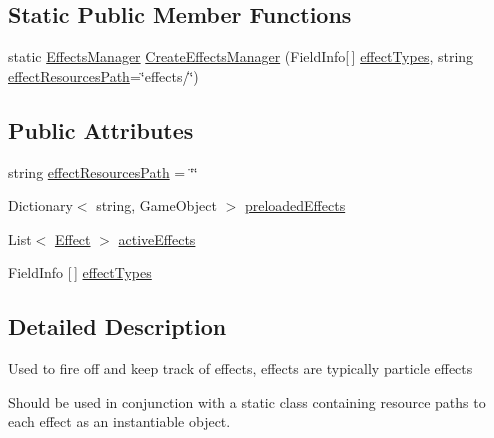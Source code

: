 \subsection*{Static Public Member Functions}
\begin{DoxyCompactItemize}
\item 
static \mbox{\hyperlink{class_stompy_blondie_1_1_systems_1_1_effects_manager}{Effects\+Manager}} \mbox{\hyperlink{class_stompy_blondie_1_1_systems_1_1_effects_manager_a9c38a685a51d9dafe2b0734a457d6801}{Create\+Effects\+Manager}} (Field\+Info\mbox{[}$\,$\mbox{]} \mbox{\hyperlink{class_stompy_blondie_1_1_systems_1_1_effects_manager_a185cf6e4134d962c94b3ea7e39355339}{effect\+Types}}, string \mbox{\hyperlink{class_stompy_blondie_1_1_systems_1_1_effects_manager_a9e917930d6e328a83cb87639ac1b3599}{effect\+Resources\+Path}}=\char`\"{}effects/\char`\"{})
\end{DoxyCompactItemize}
\subsection*{Public Attributes}
\begin{DoxyCompactItemize}
\item 
string \mbox{\hyperlink{class_stompy_blondie_1_1_systems_1_1_effects_manager_a9e917930d6e328a83cb87639ac1b3599}{effect\+Resources\+Path}} = \char`\"{}\char`\"{}
\item 
Dictionary$<$ string, Game\+Object $>$ \mbox{\hyperlink{class_stompy_blondie_1_1_systems_1_1_effects_manager_abde357ddd92a368b4eebc347b5bc3c66}{preloaded\+Effects}}
\item 
List$<$ \mbox{\hyperlink{class_stompy_blondie_1_1_systems_1_1_effect}{Effect}} $>$ \mbox{\hyperlink{class_stompy_blondie_1_1_systems_1_1_effects_manager_ae66380ec6b74d10b8e3cb2ee8e5fca1e}{active\+Effects}}
\item 
Field\+Info \mbox{[}$\,$\mbox{]} \mbox{\hyperlink{class_stompy_blondie_1_1_systems_1_1_effects_manager_a185cf6e4134d962c94b3ea7e39355339}{effect\+Types}}
\end{DoxyCompactItemize}


\subsection{Detailed Description}
Used to fire off and keep track of effects, effects are typically particle effects

Should be used in conjunction with a static class containing resource paths to each effect as an instantiable object.

